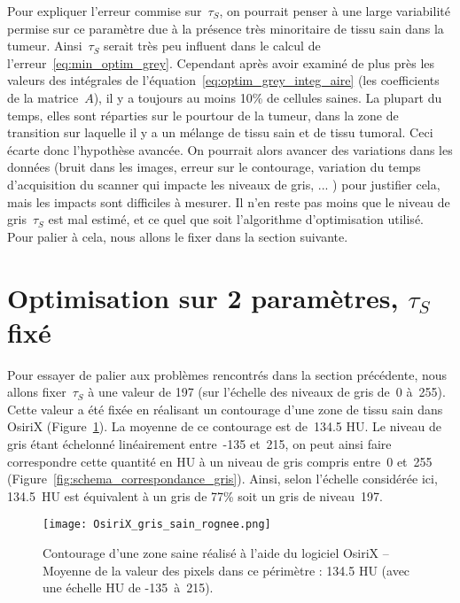 \documentclass[main.tex]{subfiles}
\begin{document}
Pour expliquer l'erreur commise sur~$\tau_S$, on pourrait penser à une large variabilité permise sur ce paramètre due à la présence très minoritaire de tissu  sain dans la tumeur. Ainsi~$\tau_S$ serait très peu influent dans le calcul de l'erreur~\eqref{eq:min_optim_grey}. Cependant après avoir examiné de plus près les valeurs des intégrales de l'équation~\eqref{eq:optim_grey_integ_aire} (\ie les coefficients de la matrice~$A$), il y a toujours au moins 10\% de cellules saines. La plupart du temps, elles sont réparties sur le pourtour de la tumeur, dans la zone de transition sur laquelle il y a un mélange de tissu sain et de tissu tumoral. Ceci écarte donc l'hypothèse avancée. On pourrait alors avancer des variations dans les données (bruit dans les images, erreur sur le contourage, variation du temps d'acquisition du scanner qui impacte les niveaux de gris, ... ) pour justifier cela, mais les impacts sont difficiles à mesurer. 
Il n'en reste pas moins que le niveau de gris~$\tau_S$ est mal estimé, et ce quel que soit l'algorithme d'optimisation utilisé. 
Pour palier à cela, nous allons le fixer dans la section suivante.


\section{Optimisation sur 2 paramètres, $\tau_S$ fixé \label{sec:optim_2_param}}
Pour essayer de palier aux problèmes rencontrés dans la section précédente, nous allons fixer~$\tau_S$ à une valeur de 197 (sur l'échelle des niveaux de gris de~0 à~255). Cette valeur a été fixée en réalisant un contourage d'une zone de tissu sain dans OsiriX (\cf  Figure~\ref{fig:contourage_sain}). La moyenne de ce contourage est de~134.5 HU. Le niveau de gris étant échelonné linéairement entre~-135 et~215, on peut ainsi faire correspondre cette quantité en HU à un niveau de gris compris entre~0 et~255 (\cf Figure~\ref{fig:schema_correspondance_gris}). Ainsi, selon l'échelle considérée ici, 134.5~HU est  équivalent à un gris de 77\% soit un gris de niveau~197.


\begin{figure}
\texttt{[image: OsiriX\_gris\_sain\_rognee.png]}
\caption{\label{fig:contourage_sain}Contourage d'une zone saine réalisé à l'aide du logiciel OsiriX -- Moyenne de la valeur des pixels dans ce périmètre : 134.5 HU (avec une échelle HU de \mbox{-135 à 215}).}
\end{figure}
\end{document}
